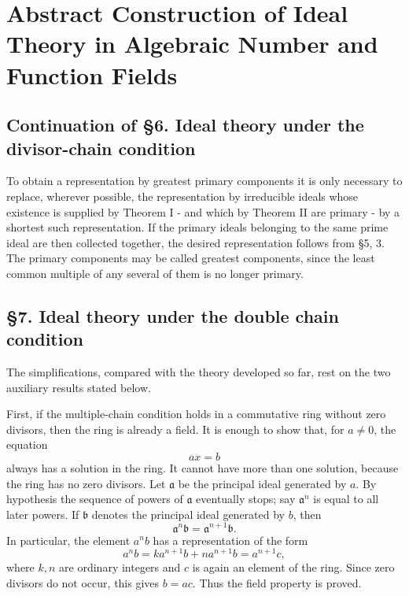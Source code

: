 \documentclass[
  12pt,
]{article}
\author{}
\date{}
\begin{document}
\section{Abstract Construction of Ideal Theory in Algebraic Number and
Function
Fields}\label{abstract-construction-of-ideal-theory-in-algebraic-number-and-function-fields}

\subsection{Continuation of §6. Ideal theory under the divisor-chain
condition}\label{continuation-of-6.-ideal-theory-under-the-divisor-chain-condition}

To obtain a representation by greatest primary components it is only
necessary to replace, wherever possible, the representation by
irreducible ideals whose existence is supplied by Theorem I - and which
by Theorem II are primary - by a shortest such representation. If the
primary ideals belonging to the same prime ideal are then collected
together, the desired representation follows from §5, 3. The primary
components may be called greatest components, since the least common
multiple of any several of them is no longer primary.

\subsection{§7. Ideal theory under the double chain
condition}\label{ideal-theory-under-the-double-chain-condition}

The simplifications, compared with the theory developed so far, rest on
the two auxiliary results stated below.

First, if the multiple-chain condition holds in a commutative ring
without zero divisors, then the ring is already a field. It is enough to
show that, for \(a\ne0\), the equation \[
  ax=b
\] always has a solution in the ring. It cannot have more than one
solution, because the ring has no zero divisors. Let \(\mathfrak a\) be
the principal ideal generated by \(a\). By hypothesis the sequence of
powers of \(\mathfrak a\) eventually stops; say \(\mathfrak a^n\) is
equal to all later powers. If \(\mathfrak b\) denotes the principal
ideal generated by \(b\), then \[
  \mathfrak a^n\mathfrak b=\mathfrak a^{n+1}\mathfrak b.
\] In particular, the element \(a^n b\) has a representation of the form
\[
  a^n b = k a^{n+1}b+n a^{n+1}b = a^{n+1}c,
\] where \(k,n\) are ordinary integers and \(c\) is again an element of
the ring. Since zero divisors do not occur, this gives \(b=ac\). Thus
the field property is proved.
\end{document}
